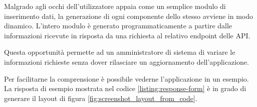 \vspace{5mm} %

Malgrado agli occhi dell'utilizzatore appaia come un semplice modulo di inserimento dati, 
la generazione di ogni componente dello stesso avviene in modo dinamico.
L'intero modulo è generato programmaticamente a partire dalle informazioni ricevute in risposta da una richiesta al relativo endpoint delle API. 

Questa opportunità permette ad un amministratore di sistema di variare le informazioni richieste
senza dover rilasciare un aggiornamento dell'applicazione.

\vspace{5mm} %

Per facilitarne la comprensione è possibile vederne l'applicazione in un esempio. La risposta di esempio mostrata nel codice 
\ref{listing:response-form} è in grado di generare il layout di figura \ref{fig:screenshot_layout_from_code}.

